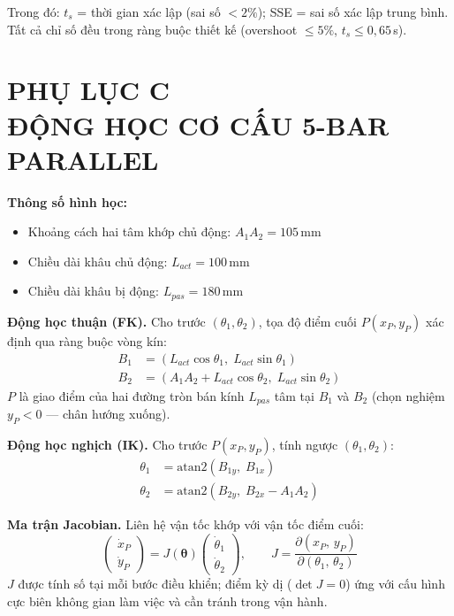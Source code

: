\noindent Trong đó: $t_s$ = thời gian xác lập (sai số $< 2\%$);
SSE = sai số xác lập trung bình.
Tất cả chỉ số đều trong ràng buộc thiết kế
(overshoot $\leq 5\%$, $t_s \leq 0{,}65\,$s).

\endgroup


\chapter*{PHỤ LỤC C\\[0.4em]ĐỘNG HỌC CƠ CẤU 5-BAR PARALLEL}
\label{app:fivebar}

\begingroup
{}
\fontsize{13pt}{15.6pt}\selectfont
\setlength{\parskip}{6pt}

\textbf{Thông số hình học:}
\begin{itemize}[leftmargin=1.5cm]
    \item Khoảng cách hai tâm khớp chủ động: $A_1A_2 = 105\,$mm
    \item Chiều dài khâu chủ động: $L_{act} = 100\,$mm
    \item Chiều dài khâu bị động: $L_{pas} = 180\,$mm
\end{itemize}

\textbf{Động học thuận (FK).}
Cho trước $(\theta_1, \theta_2)$, tọa độ điểm cuối $P(x_P, y_P)$ xác định qua
ràng buộc vòng kín:
\begin{align}
    B_1 &= (L_{act}\cos\theta_1,\; L_{act}\sin\theta_1) \\
    B_2 &= (A_1A_2 + L_{act}\cos\theta_2,\; L_{act}\sin\theta_2)
\end{align}
$P$ là giao điểm của hai đường tròn bán kính $L_{pas}$ tâm tại $B_1$ và $B_2$
(chọn nghiệm $y_P < 0$ — chân hướng xuống).

\textbf{Động học nghịch (IK).}
Cho trước $P(x_P, y_P)$, tính ngược $(\theta_1, \theta_2)$:
\begin{align}
    \theta_1 &= \mathrm{atan2}(B_{1y},\; B_{1x}) \\
    \theta_2 &= \mathrm{atan2}(B_{2y},\; B_{2x} - A_1A_2)
\end{align}

\textbf{Ma trận Jacobian.}
Liên hệ vận tốc khớp với vận tốc điểm cuối:
\begin{equation}
    \begin{pmatrix} \dot{x}_P \\ \dot{y}_P \end{pmatrix}
    = J(\boldsymbol{\theta})
    \begin{pmatrix} \dot{\theta}_1 \\ \dot{\theta}_2 \end{pmatrix},
    \qquad J = \frac{\partial(x_P,\,y_P)}{\partial(\theta_1,\,\theta_2)}
\end{equation}
$J$ được tính số tại mỗi bước điều khiển; điểm kỳ dị ($\det J = 0$) ứng
với cấu hình cực biên không gian làm việc và cần tránh trong vận hành.

\endgroup
